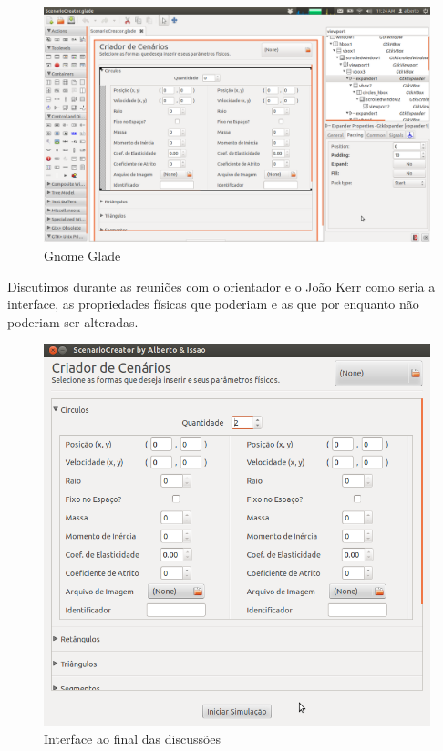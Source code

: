 \begin{figure}[H]
	\centering
	\includegraphics[scale=0.2]{images/glade.png}
	\caption{Gnome Glade}
\end{figure}

Discutimos durante as reuniões com o orientador e o João Kerr como seria a interface, as propriedades físicas que poderiam e as que por enquanto não poderiam ser alteradas.

\begin{figure}[H]
	\centering
	\includegraphics[scale=0.4]{images/physimulation.png}
	\caption{Interface ao final das discussões}
\end{figure}

